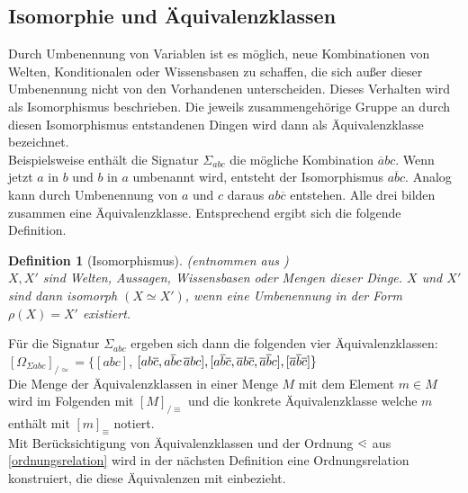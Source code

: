 \documentclass[12pt,a4paper]{article}
\newtheorem{theorem}{Definition}
\newcommand\dotl{\mathrel{%
    \mathchoice{\QEQ}{\QEQ}{\QEQ}{\QEQ}%
}}
\def\QEQ{{%
    \setbox0\hbox{<}%
    \rlap{\hbox to \wd0{\hss \raisebox {0.1pt}{$\ \cdot$\hss}}}\box0
}}
\begin{document}
\subsection{Isomorphie und Äquivalenzklassen}
Durch Umbenennung von Variablen ist es möglich, neue Kombinationen von Welten, Konditionalen oder Wissensbasen zu schaffen, die sich außer dieser Umbenennung nicht von den Vorhandenen unterscheiden. Dieses Verhalten wird als Isomorphismus beschrieben. Die jeweils zusammengehörige Gruppe an durch diesen Isomorphismus entstandenen Dingen wird dann als Äquivalenzklasse bezeichnet.\\
Beispielsweise enthält die Signatur $\Sigma_{abc}$ die mögliche Kombination $\overline{a}bc$. Wenn jetzt $a$ in $b$ und $b$ in $a$ umbenannt wird, entsteht der Isomorphismus $a\overline{b}c$. Analog kann durch Umbenennung von $a$ und $c$ daraus $ab\overline{c}$ entstehen. Alle drei bilden zusammen eine Äquivalenzklasse. Entsprechend ergibt sich die folgende Definition.
\begin{theorem}[Isomorphismus](entnommen aus \cite{beierle19}) \ \\
$X, X'$ sind Welten, Aussagen, Wissensbasen oder Mengen dieser Dinge. $X$ und $X'$ sind dann isomorph $(X \simeq X')$, wenn eine Umbenennung in der Form $\rho(X) = X'$ existiert.
\end{theorem}
Für die Signatur $\Sigma_{abc}$ ergeben sich dann die folgenden vier Äquivalenzklassen: \\
$[\Omega_{\Sigma abc}]_{/\simeq}=\{[abc]$, $[ab\overline{c}, a\overline{b}c\, \overline{a}bc], [a\overline{b}\overline{c}, \overline{a\\}b\overline{c}, \overline{a}\overline{b}c], [\overline{a}\overline{b}\overline{c}]\}$ \\
Die Menge der Äquivalenzklassen in einer Menge $M$ mit dem Element $m \in M$ wird im Folgenden mit $[M]_{/\equiv}$ und die konkrete Äquivalenzklasse welche $m$ enthält mit $[m]_\equiv$ notiert.\\
Mit Berücksichtigung von Äquivalenzklassen und der Ordnung $\dotl$ aus \autoref{ordnungsrelation} wird in der nächsten Definition eine Ordnungsrelation konstruiert, die diese Äquivalenzen mit einbezieht.
\end{document}
